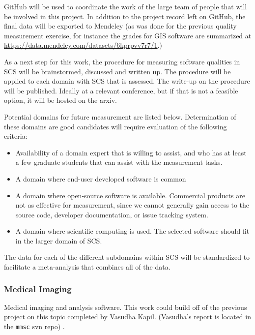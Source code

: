 \documentclass[12pt]{article}
\begin{document}
GitHub will be used to coordinate the work of the large team of people that will
be involved in this project.  In addition to the project record left on GitHub,
the final data will be exported to Mendeley (as was done for the previous
quality measurement exercise, for instance the grades for GIS software are
summarized at \href{https://data.mendeley.com/datasets/6kprpvv7r7/1}
{https://data.mendeley.com/datasets/6kprpvv7r7/1}.)

As a next step for this work, the procedure for measuring software qualities in
SCS will be brainstormed, discussed and written up.  The procedure will be
applied to each domain with SCS that is assessed.  The write-up on the procedure
will be published.  Ideally at a relevant conference, but if that is not a
feasible option, it will be hosted on the arxiv.

Potential domains for future measurement are listed below.  Determination of
these domains are good candidates will require evaluation of the following
criteria:

\begin{itemize}
\item Availability of a domain expert that is willing to assist, and who has at
  least a few graduate students that can assist with the measurement tasks.
\item A domain where end-user developed software is common
\item A domain where open-source software is available.  Commercial products are
  not as effective for measurement, since we cannot generally gain access to the
  source code, developer documentation, or issue tracking system.
\item A domain where scientific computing is used.  The selected software should
  fit in the larger domain of SCS.
\end{itemize}

The data for each of the different subdomains within SCS will be standardized to
facilitate a meta-analysis that combines all of the data.

\subsubsection{Medical Imaging}

Medical imaging and analysis software.  This work could build off of the
previous project on this topic completed by Vasudha Kapil.  (Vasudha's report is
located in the \texttt{mmsc} svn repo) .  %
\end{document}
